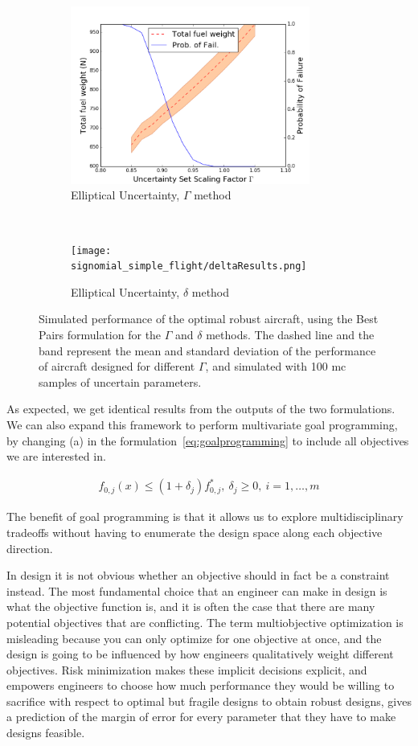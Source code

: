 \begin{figure}[ht]
    \centering
    \captionsetup{justification=centering, font=small}
    \begin{subfigure}{0.49\textwidth}
        \centering
        \includegraphics[height=2.3in]{signomial_simple_flight/ell_best_pairs.png}
         \caption{Elliptical Uncertainty, $\Gamma$ method}
    \end{subfigure}%
    ~
    \begin{subfigure}{0.49\textwidth}
        \centering
        \texttt{[image: signomial\_simple\_flight/deltaResults.png]}
         \caption{Elliptical Uncertainty, $\delta$ method}
    \end{subfigure}
    \caption{Simulated performance of the optimal robust aircraft, using the Best Pairs formulation
    for the $\Gamma$ and $\delta$ methods.
    The dashed line and the band represent the mean and standard deviation of the performance
    of aircraft designed for different $\Gamma$,
    and simulated with 100 \gls{mc} samples of uncertain parameters.}
    \label{fig:deltaVsGamma}
\end{figure}

As expected, we get identical results from the outputs of the two formulations.
We can also expand this framework to perform multivariate goal programming,
by changing (a) in the formulation~\ref{eq:goalprogramming} to include all
objectives we are interested in.

\begin{align*}
    f_{0,j}(x) \leq (1+\delta_j) f^*_{0,j},~\delta_j \geq 0,~i = 1,\ldots, m
    \label{eq:multigoal}
\end{align*}

The benefit of goal programming is that it allows us to explore multidisciplinary tradeoffs without
having to enumerate the design space along each objective direction.

In design it is not obvious whether an objective should in fact be a constraint instead. The most
fundamental choice that an engineer can make in design is what the objective function is, and it is
often the case that there are many potential objectives that are conflicting. The term multiobjective optimization is misleading
because you can only optimize for one objective at once,
and the design is going to be influenced by how engineers qualitatively weight different objectives.
Risk minimization makes these implicit decisions explicit, and empowers engineers to choose
how much performance they would be willing to sacrifice with respect
to optimal but fragile designs to obtain robust designs, gives a prediction of the margin of error
for every parameter that they have to make designs feasible.

